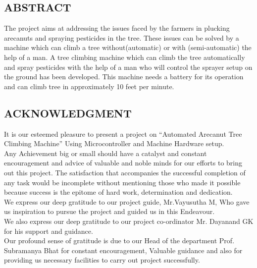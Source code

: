 \documentclass[12pt,a4paper]{article}
\begin{document}
\begin{center}
\section*{ABSTRACT}
\end{center}
The project aims at addressing the issues faced by the farmers in plucking arecanuts and spraying pesticides in the tree. These issues can be solved by a machine which can climb a tree without(automatic) or with (semi-automatic) the help of a man.
A tree climbing machine which can climb the tree automatically and spray pesticides with the help of a man who will control the sprayer setup on the ground has been developed. This machine needs a battery for its operation and can climb tree in approximately 10 feet per minute.
\newpage
\begin{center}
\section*{ACKNOWLEDGMENT}
\end{center}
It is our esteemed pleasure to present a project on “Automated Arecanut Tree Climbing Machine” Using Microcontroller and Machine Hardware setup.\\

Any Achievement big or small should have a catalyst and constant encouragement and advice of valuable and noble minds for our efforts to bring out this project. The satisfaction that accompanies the successful completion of any task would be incomplete without mentioning those who made it possible because success is the epitome of hard work, determination and dedication.\\

We express our deep gratitude to our project guide, Mr.Vayusutha M, Who gave us inspiration to pursue the project and guided us in this Endeavour.\\

We also express our deep gratitude to our project co-ordinator Mr. Dayanand GK for his support and guidance.\\

Our profound sense of gratitude is due to our Head of the department Prof. Subramanya Bhat for constant encouragement, Valuable guidance and also for providing us necessary facilities to carry out project successfully.\\
\end{document}
